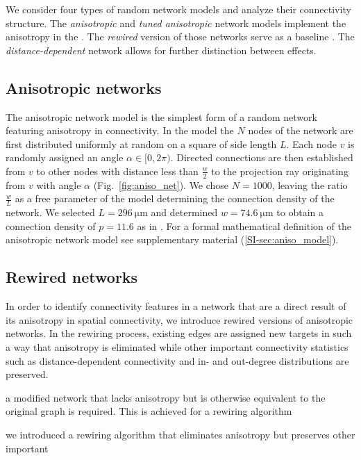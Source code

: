 
We consider four types of random network models and analyze their
connectivity structure. The \textit{anisotropic} and \textit{tuned
anisotropic} network models implement the anisotropy in the
. The \textit{rewired} version of those networks serve as a baseline
. The \textit{distance-dependent} network allows for further
distinction between effects.

\subsection*{Anisotropic networks}

The anisotropic network model is the simplest form of a random network
featuring anisotropy in connectivity. In the model the $N$ nodes of
the network are first distributed uniformly at random on a square of
side length $L$. Each node $v$ is randomly assigned an angle $\alpha
\in [0,2\pi)$. Directed connections are then established from $v$ to
other nodes with distance less than $\frac{w}{2}$ to the projection
ray originating from $v$ with angle $\alpha$ (Fig.~\ref{fig:aniso_net}).
We chose $N=1000$, leaving the ratio $\frac{w}{L}$ as a free parameter
of the model determining the connection density of the network. We
selected $L=\SI{296}{\micro\meter}$ and determined $w=\SI{74.6}%
{\micro\meter}$ to obtain a connection density of $p=11.6$ as in
\cite{Song2005}. For a formal mathematical definition of the
anisotropic network model see supplementary material
(\ref{SI-sec:aniso_model}).






\bigskip

\subsection*{Rewired networks}
%
In order to identify connectivity features in a network that are a
direct result of its anisotropy in spatial connectivity, we introduce
rewired versions of anisotropic networks. In the rewiring process,
existing edges are assigned new targets in such a way that anisotropy
is eliminated while other important connectivity statistics
such as distance-dependent connectivity and in- and out-degree
distributions are preserved.

a modified
network that lacks anisotropy but is otherwise equivalent to the
original graph is required. This is achieved for a rewiring algorithm


we introduced a rewiring algorithm that eliminates anisotropy but preserves other important 


